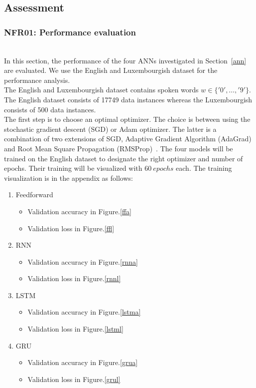 
\subsection{Assessment}
\subsubsection{NFR01: Performance evaluation}~\label{assessment}~\\

In this section, the performance of the four ANNs investigated in
Section~\ref{ann} are evaluated. We use the English and Luxembourgish dataset
for the performance analysis.\\

The English and Luxembourgish dataset contains spoken words $w \in
\{'0',\dots,'9'\}$. The English dataset consists of 17749 data instances whereas
the Luxembourgish consists of 500 data instances.\\

The first step is to choose an optimal optimizer. The choice is between using
the stochastic gradient descent (SGD) or Adam optimizer. The latter is a
combination of two extensions of SGD, Adaptive Gradient Algorithm (AdaGrad) and
Root Mean Square Propagation (RMSProp)~\cite{Adam}. The four models will be
trained on the English dataset to designate the right optimizer and number of
epochs. Their training will be visualized with $60\ epochs$ each. The training
visualization is in the appendix as follows:\\

\begin{enumerate}[label=\arabic*.]
  \item Feedforward
    \begin{itemize}
      \item Validation accuracy in Figure.\ref{ffa}
      \item Validation loss in Figure.\ref{ffl}
    \end{itemize}
  \item RNN
    \begin{itemize}
      \item Validation accuracy in Figure.\ref{rnna}
      \item Validation loss in Figure.\ref{rnnl}
    \end{itemize}
  \item LSTM
    \begin{itemize}
      \item Validation accuracy in Figure.\ref{lstma}
      \item Validation loss in Figure.\ref{lstml}
    \end{itemize}
  \item GRU
    \begin{itemize}
      \item Validation accuracy in Figure.\ref{grua}
      \item Validation loss in Figure.\ref{grul}
    \end{itemize}
\end{enumerate}~\\

